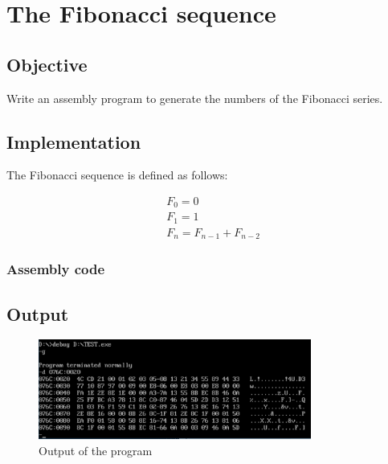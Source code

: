 \section{The Fibonacci sequence}

\subsection{Objective}
Write an assembly program to generate the numbers of the Fibonacci series.


\subsection{Implementation}

The Fibonacci sequence is defined as follows:

\begin{align*}
	 & F_0 = 0                 \\
	 & F_1 = 1                 \\
	 & F_n = F_{n-1} + F_{n-2}
\end{align*}

\subsubsection{Assembly code}


\subsection{Output}

\begin{figure}[h]
	\centering
	\includegraphics[width=0.8\textwidth]{./res/practicals/fib.png}
	\caption{Output of the program}
	\label{fig:fibonacci}
\end{figure}
